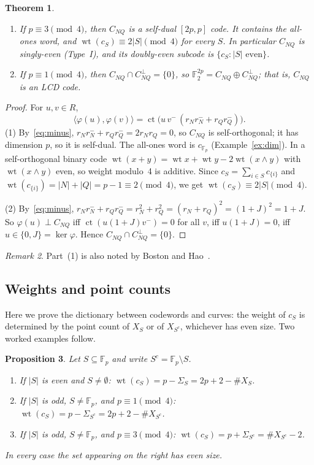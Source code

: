 \documentclass[12pt,letterpaper]{article}
\newtheorem{theorem}{Theorem}[section]
\newtheorem{proposition}[theorem]{Proposition}
\theoremstyle{definition}
\theoremstyle{remark}
\newtheorem{remark}[theorem]{Remark}
\numberwithin{equation}{section}
\newcommand{\F}{\mathbb{F}}
\newcommand{\Fp}{\mathbb{F}_p}
\newcommand{\wt}{\operatorname{wt}}
\newcommand{\ct}{\operatorname{ct}}
\newcommand{\CNQ}{C_{NQ}}
\newcommand{\X}{\#X}
\begin{document}
\begin{theorem}\label{thm:duality}
\begin{enumerate}
\item If $p\equiv3\pmod4$, then $\CNQ$ is a self-dual $[2p,p]$ code. It contains the
all-ones word, and $\wt(c_S)\equiv2|S|\pmod4$ for every $S$. In particular
$\CNQ$ is singly-even (Type~I), and its doubly-even subcode is
$\{c_S:|S|\text{ even}\}$.
\item If $p\equiv1\pmod4$, then $\CNQ\cap\CNQ^\perp=\{0\}$, so
$\F_2^{2p}=\CNQ\oplus\CNQ^\perp$; that is, $\CNQ$ is an LCD code.
\end{enumerate}
\end{theorem}

\begin{proof}
For $u,v\in R$,
\begin{equation}\label{eq:ip}
\langle\varphi(u),\varphi(v)\rangle
=\ct\big(u\,v^-\,(r_Nr_N^-+r_Qr_Q^-)\big).
\end{equation}
(1) By~\eqref{eq:minus}, $r_Nr_N^-+r_Qr_Q^-=2r_Nr_Q=0$, so $\CNQ$ is
self-orthogonal; it has dimension $p$, so it is self-dual. The all-ones word is
$c_{\Fp}$ (Example~\ref{ex:dim}). In a self-orthogonal binary code
$\wt(x+y)=\wt x+\wt y-2\wt(x\wedge y)$ with $\wt(x\wedge y)$ even, so weight
modulo~4 is additive. Since $c_S=\sum_{i\in S}c_{\{i\}}$ and
$\wt(c_{\{i\}})=|N|+|Q|=p-1\equiv2\pmod4$, we get $\wt(c_S)\equiv2|S|\pmod 4$.

(2) By~\eqref{eq:minus}, $r_Nr_N^-+r_Qr_Q^-=r_N^2+r_Q^2=(r_N+r_Q)^2=(1+J)^2=1+J$.
So $\varphi(u)\perp\CNQ$ iff $\ct(u(1+J)v^-)=0$ for all $v$, iff $u(1+J)=0$, iff
$u\in\{0,J\}=\ker\varphi$. Hence $\CNQ\cap\CNQ^\perp=\{0\}$.
\end{proof}

\begin{remark}
Part~(1) is also noted by Boston and Hao~\cite{BH17}.
\end{remark}

\subsection{Weights and point counts}
Here we prove the dictionary between codewords and curves: the weight of $c_S$ is
determined by the point count of $X_S$ or of $X_{S^c}$, whichever has even size. Two
worked examples follow.

\begin{proposition}\label{prop:main}
Let $S\subseteq\Fp$ and write $S^c=\Fp\setminus S$.
\begin{enumerate}
\item[(a)] If $|S|$ is even and $S\neq\emptyset$: $\wt(c_S)=p-\Sigma_S=2p+2-\X_S$.
\item[(b)] If $|S|$ is odd, $S\ne\Fp$, and $p\equiv1\pmod4$:
$\wt(c_S)=p-\Sigma_{S^c}=2p+2-\X_{S^c}$.
\item[(c)] If $|S|$ is odd, $S\ne\Fp$, and $p\equiv3\pmod4$:
$\wt(c_S)=p+\Sigma_{S^c}=\X_{S^c}-2$.
\end{enumerate}
In every case the set appearing on the right has even size.
\end{proposition}
\end{document}
